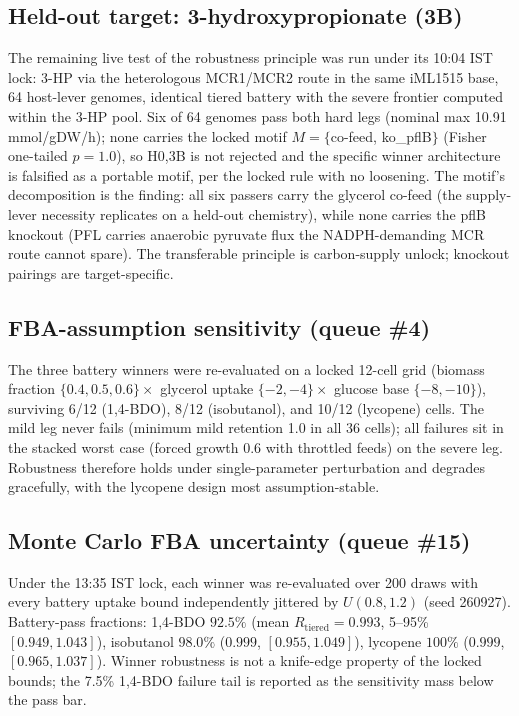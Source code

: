 \documentclass[12pt,a4paper]{article}
\begin{document}
\subsection{Held-out target: 3-hydroxypropionate (3B)}
The remaining live test of the robustness principle was run under its 10:04 IST lock: 3-HP via the heterologous MCR1/MCR2 route in the same iML1515 base, 64 host-lever genomes, identical tiered battery with the severe frontier computed within the 3-HP pool. Six of 64 genomes pass both hard legs (nominal max 10.91 mmol/gDW/h); none carries the locked motif $M=\{$co-feed, ko\_pflB$\}$ (Fisher one-tailed $p=1.0$), so H0,3B is not rejected and the specific winner architecture is falsified as a portable motif, per the locked rule with no loosening. The motif's decomposition is the finding: all six passers carry the glycerol co-feed (the supply-lever necessity replicates on a held-out chemistry), while none carries the pflB knockout (PFL carries anaerobic pyruvate flux the NADPH-demanding MCR route cannot spare). The transferable principle is carbon-supply unlock; knockout pairings are target-specific.

\subsection{FBA-assumption sensitivity (queue \#4)}
The three battery winners were re-evaluated on a locked 12-cell grid (biomass fraction $\{0.4,0.5,0.6\}\times$ glycerol uptake $\{-2,-4\}\times$ glucose base $\{-8,-10\}$), surviving 6/12 (1,4-BDO), 8/12 (isobutanol), and 10/12 (lycopene) cells. The mild leg never fails (minimum mild retention 1.0 in all 36 cells); all failures sit in the stacked worst case (forced growth 0.6 with throttled feeds) on the severe leg. Robustness therefore holds under single-parameter perturbation and degrades gracefully, with the lycopene design most assumption-stable.

\subsection{Monte Carlo FBA uncertainty (queue \#15)}
Under the 13:35 IST lock, each winner was re-evaluated over 200 draws with every battery uptake bound independently jittered by $U(0.8,1.2)$ (seed 260927). Battery-pass fractions: 1,4-BDO $92.5\%$ (mean $R_{\mathrm{tiered}}=0.993$, 5--95\% $[0.949,1.043]$), isobutanol $98.0\%$ ($0.999$, $[0.955,1.049]$), lycopene $100\%$ ($0.999$, $[0.965,1.037]$). Winner robustness is not a knife-edge property of the locked bounds; the 7.5\% 1,4-BDO failure tail is reported as the sensitivity mass below the pass bar.
\end{document}
